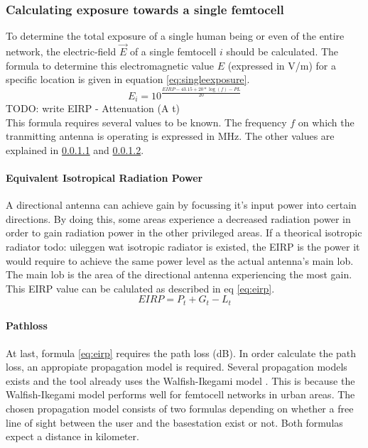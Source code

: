 \subsubsection{Calculating exposure towards a single femtocell}
\label{sec:calculatingexposure}

To determine the total exposure of a single human being or even of the entire network, the electric-field $\vec{E}$ of a single femtocell $i$ should be calculated.
The formula to determine this electromagnetic value $E$ (expressed in V/m) for a specific location is given in equation \ref{eq:singleexposure}.
\begin{equation}
E_i = 10^{\frac{EIRP - 43.15 + 20*\log(f)- PL}{20}}
\label{eq:singleexposure}
\end{equation}
TODO: write EIRP - Attenuation (A t)\\
This formula requires several values to be known. The frequency $f$ on which the tranmitting antenna is operating is expressed in MHz. The other values are explained in \ref{subsec:eirp} and \ref{subsec:pl}.
\paragraph{Equivalent Isotropical Radiation Power}
\label{subsec:eirp}

A directional antenna can achieve gain by focussing it's input power into certain directions. By doing this, some areas experience a decreased radiation power in order to gain radiation power 
in the other privileged areas. If a theorical isotropic radiator \color{red}todo: uileggen wat isotropic radiator is\color{black} existed, the \gls{EIRP} is the power it would require to achieve the same power level as the actual antenna's main lob. The main lob is the area of the directional antenna experiencing the most gain.
This \gls{EIRP} value can be calulated as described in eq \ref{eq:eirp}.
\begin{equation}
EIRP = P_t + G_t - L_t
\label{eq:eirp}
\end{equation}

\paragraph{Pathloss}
\label{subsec:pl}
At last, formula \ref{eq:eirp} requires the path loss (dB). In order calculate the path loss, an appropiate propagation model is required. Several propagation models exists and the tool already uses the Walfish-Ikegami model \cite{J2}.
This is because the Walfish-Ikegami model performs well for femtocell networks in urban areas. %
The chosen propagation model consists of two formulas depending on whether a free line of sight between the user and the basestation exist or not. Both formulas expect a distance in kilometer. %

